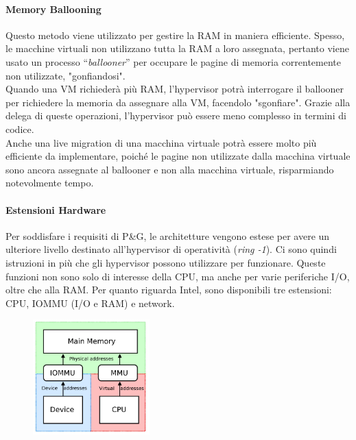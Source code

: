 \documentclass{article}
\begin{document}
		\paragraph{Memory Ballooning}
		Questo metodo viene utilizzato per gestire la RAM in maniera efficiente. Spesso, le
		macchine virtuali non utilizzano tutta la RAM a loro assegnata, pertanto viene usato un
		processo “\emph{ballooner}” per occupare le pagine di memoria correntemente non utilizzate, "gonfiandosi".\\
		Quando una VM richiederà più RAM, l’hypervisor potrà interrogare il
		ballooner per richiedere la memoria da assegnare alla VM, facendolo "sgonfiare". Grazie alla delega di queste operazioni, l'hypervisor può essere meno complesso in termini di codice.\\
		
		Anche una live migration di una macchina virtuale potrà essere molto più efficiente da
		implementare, poiché le pagine non utilizzate dalla macchina virtuale sono ancora
		assegnate al ballooner e non alla macchina virtuale, risparmiando notevolmente tempo.
		
		\paragraph{Estensioni Hardware}
		Per soddisfare i requisiti di P\&G, le architetture vengono estese per avere un ulteriore
		livello destinato all'hypervisor di operatività (\emph{ring -1}). Ci sono quindi istruzioni in più che gli hypervisor
		possono utilizzare per funzionare. Queste funzioni non sono solo di interesse della
		CPU, ma anche per varie periferiche I/O, oltre che alla RAM.
		Per quanto riguarda Intel, sono disponibili tre estensioni: CPU, IOMMU (I/O e RAM) e
		network.
		
		\begin{figure}[ht]
			\centering
			\includegraphics[width=0.4\textwidth]{SAC_B1_virtualizationIO_HW.png} %
		\end{figure}
		
\end{document}
